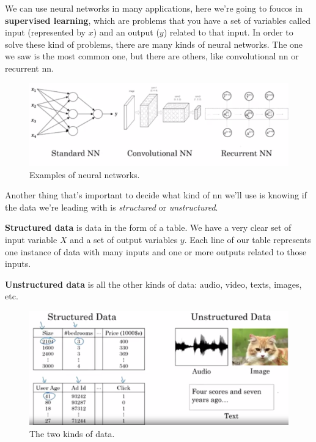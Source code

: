 \documentclass[12pt, a4paper, oneside]{book}
\begin{document}
We can use neural networks in many applications, here we're going to foucos in
\textbf{supervised learning}, which are problems that you have a set of
variables called input (represented by $x$) and an output ($y$) related to that
input. In order to solve these kind of problems, there are many kinds of neural
networks. The one we saw is the most common one, but there are others, like
convolutional nn or recurrent nn.

\begin{figure}[h]
\centering
\includegraphics[scale=0.3]{Res/examples_nn.png}
\caption{Examples of neural networks.}
\label{examples_nn.png}
\end{figure}

Another thing that's important to decide what kind of nn we'll use is knowing if
the data we're leading with is \textit{structured} or \textit{unstructured}.

\textbf{Structured data} is data in the form of a table. We have a very clear
set of input variable $X$ and a set of output variables $y$. Each line of our
table represents one instance of data with many inputs and one or more outputs
related to those inputs.

\textbf{Unstructured data} is all the other kinds of data: audio, video, texts,
images, etc.

\begin{figure}[h]
\centering
\includegraphics[scale=0.4]{Res/structured_vs_unstructed_data.png}
\caption{The two kinds of data.}
\label{structured_vs_unstructed_data.png}
\end{figure}
\end{document}
